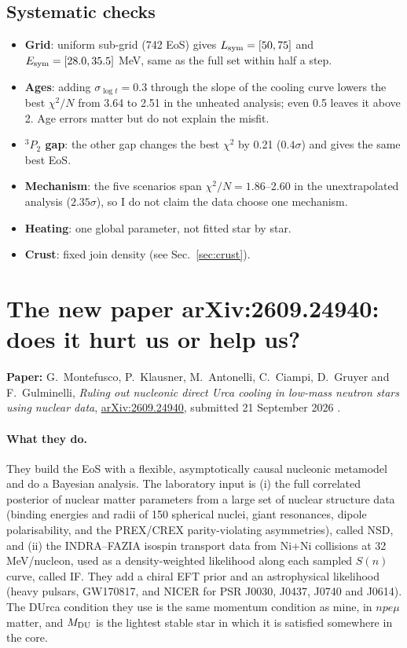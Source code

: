 \documentclass[11pt,a4paper]{article}
\newcommand{\Esym}{E_{\rm sym}}
\newcommand{\Lsym}{L_{\rm sym}}
\newcommand{\arxiv}[1]{\href{https://arxiv.org/abs/#1}{arXiv:#1}}
\begin{document}
\subsection{Systematic checks}\label{sec:syst}
\begin{itemize}
\item \textbf{Grid}: uniform sub-grid (742 EoS) gives $\Lsym=[50,75]$ and $\Esym=[28.0,35.5]$ MeV, same as the full set within half a step.
\item \textbf{Ages}: adding $\sigma_{\log t}=0.3$ through the slope of the cooling curve lowers the best $\chi^2/N$ from 3.64 to 2.51 in the unheated analysis; even 0.5 leaves it above 2. Age errors matter but do not explain the misfit.
\item \textbf{$^3P_2$ gap}: the other gap changes the best $\chi^2$ by 0.21 ($0.4\sigma$) and gives the same best EoS.
\item \textbf{Mechanism}: the five scenarios span $\chi^2/N=1.86$--2.60 in the unextrapolated analysis ($2.35\sigma$), so I do not claim the data choose one mechanism.
\item \textbf{Heating}: one global parameter, not fitted star by star.
\item \textbf{Crust}: fixed join density (see Sec.~\ref{sec:crust}).
\end{itemize}

\section{The new paper arXiv:2609.24940: does it hurt us or help us?}\label{sec:newpaper}
\textbf{Paper:} G.~Montefusco, P.~Klausner, M.~Antonelli, C.~Ciampi, D.~Gruyer and F.~Gulminelli, \emph{Ruling out nucleonic direct Urca cooling in low-mass neutron stars using nuclear data}, \arxiv{2609.24940}, submitted 21 September 2026 \cite{Montefusco2026}.

\paragraph{What they do.} They build the EoS with a flexible, asymptotically causal nucleonic metamodel and do a Bayesian analysis. The laboratory input is (i) the full correlated posterior of nuclear matter parameters from a large set of nuclear structure data (binding energies and radii of 150 spherical nuclei, giant resonances, dipole polarisability, and the PREX/CREX parity-violating asymmetries), called NSD, and (ii) the INDRA--FAZIA isospin transport data from Ni+Ni collisions at 32 MeV/nucleon, used as a density-weighted likelihood along each sampled $S(n)$ curve, called IF. They add a chiral EFT prior and an astrophysical likelihood (heavy pulsars, GW170817, and NICER for PSR J0030, J0437, J0740 and J0614). The DUrca condition they use is the same momentum condition as mine, in $npe\mu$ matter, and $M_{\rm DU}$ is the lightest stable star in which it is satisfied somewhere in the core.
\end{document}
